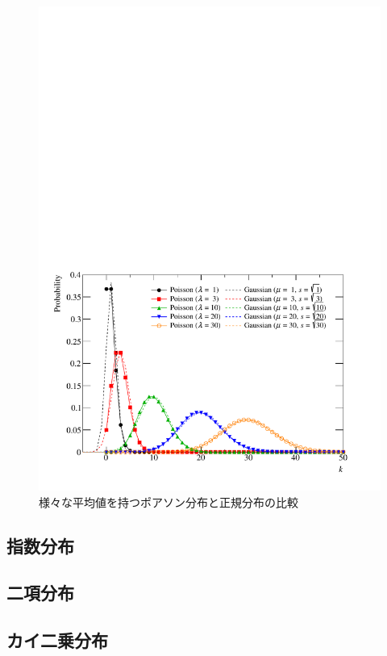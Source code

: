 \begin{figure}
  \centering
  \includegraphics[width=12cm]{fig/Poisson.pdf}
  \caption{様々な平均値を持つポアソン分布と正規分布の比較}
  \label{fig_Poisson}
\end{figure}

\subsection{指数分布}
\subsection{二項分布}
\subsection{カイ二乗分布}

